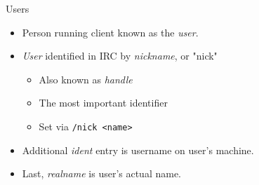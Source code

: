 \documentclass{beamer}
\begin{document}
\begin{frame}{Users}
\begin{itemize}
	\item Person running client known as the \emph{user}.
	\item \emph{User} identified in IRC by \emph{nickname}, or "nick"
	\begin{itemize}
		\item Also known as \emph{handle}
		\item The most important identifier
		\item Set via \texttt{/nick <name>}
	\end{itemize}
	\item Additional \emph{ident} entry is username on user's machine.
	\item Last, \emph{realname} is user's actual name.
\end{itemize}
\end{frame}
\end{document}
